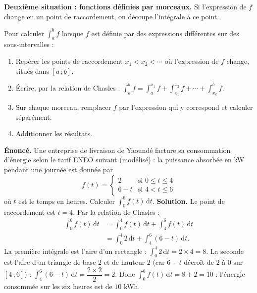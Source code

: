 \documentclass[11pt]{article}
\newcommand{\cle}[1]{{\popxbold\color{popdark}#1}}
\begin{document}
\textbf{Deuxième situation : fonctions définies par morceaux.} Si l'expression de $f$ change en un point de raccordement, on découpe l'intégrale à ce point.

\begin{methode}
Pour calculer $\displaystyle\int_a^b f$ lorsque $f$ est définie par des expressions différentes sur des sous-intervalles :
\begin{enumerate}
\item Repérer les \cle{points de raccordement} $x_1 < x_2 < \cdots$ où l'expression de $f$ change, situés dans $[a\,;b]$.
\item Écrire, par la relation de Chasles : $\displaystyle\int_a^b f = \int_a^{x_1} f + \int_{x_1}^{x_2} f + \cdots + \int_{x_k}^{b} f$.
\item Sur chaque morceau, remplacer $f$ par l'expression qui y correspond et calculer séparément.
\item Additionner les résultats.
\end{enumerate}
\end{methode}

\begin{exoresolu}
\textbf{Énoncé.} Une entreprise de livraison de Yaoundé facture sa consommation d'énergie selon le tarif ENEO suivant (modélisé) : la puissance absorbée en kW pendant une journée est donnée par
\[ f(t) = \begin{cases} 2 & \text{si } 0 \leq t \leq 4 \\ 6 - t & \text{si } 4 < t \leq 6 \end{cases} \]
où $t$ est le temps en heures. Calculer $\displaystyle\int_0^6 f(t)\,\mathrm{d}t$.
\tcblower
\textbf{Solution.} Le point de raccordement est $t = 4$. Par la relation de Chasles :
\begin{align*}
\int_0^6 f(t)\,\mathrm{d}t &= \int_0^4 f(t)\,\mathrm{d}t + \int_4^6 f(t)\,\mathrm{d}t \\
&= \int_0^4 2\,\mathrm{d}t + \int_4^6 (6-t)\,\mathrm{d}t.
\end{align*}
La première intégrale est l'aire d'un rectangle : $\int_0^4 2\,\mathrm{d}t = 2 \times 4 = 8$.
La seconde est l'aire d'un triangle de base $2$ et de hauteur $2$ (car $6 - t$ décroît de $2$ à $0$ sur $[4\,;6]$) : $\int_4^6 (6-t)\,\mathrm{d}t = \dfrac{2 \times 2}{2} = 2$.
Donc $\displaystyle\int_0^6 f(t)\,\mathrm{d}t = 8 + 2 = 10$ : l'énergie consommée sur les six heures est de $10$ kWh.
\end{exoresolu}
\end{document}
